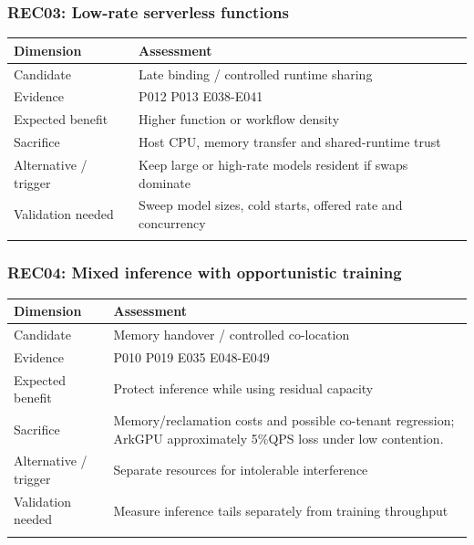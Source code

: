 \subsubsection*{REC03: Low-rate serverless functions}
\begin{longtable}{>{\raggedright\arraybackslash}p{}>{\raggedright\arraybackslash}p{}}
\toprule
\textbf{Dimension} & \textbf{Assessment}\\\midrule\endhead
Candidate & Late binding / controlled runtime sharing\\\addlinespace
Evidence & P012 P013 E038-E041\\\addlinespace
Expected benefit & Higher function or workflow density\\\addlinespace
Sacrifice & Host CPU, memory transfer and shared-runtime trust\\\addlinespace
Alternative / trigger & Keep large or high-rate models resident if swaps dominate\\\addlinespace
Validation needed & Sweep model sizes, cold starts, offered rate and concurrency\\\addlinespace
\bottomrule\end{longtable}
\subsubsection*{REC04: Mixed inference with opportunistic training}
\begin{longtable}{>{\raggedright\arraybackslash}p{}>{\raggedright\arraybackslash}p{}}
\toprule
\textbf{Dimension} & \textbf{Assessment}\\\midrule\endhead
Candidate & Memory handover / controlled co-location\\\addlinespace
Evidence & P010 P019 E035 E048-E049\\\addlinespace
Expected benefit & Protect inference while using residual capacity\\\addlinespace
Sacrifice & Memory/reclamation costs and possible co-tenant regression; ArkGPU approximately 5\%QPS loss under low contention.\\\addlinespace
Alternative / trigger & Separate resources for intolerable interference\\\addlinespace
Validation needed & Measure inference tails separately from training throughput\\\addlinespace
\bottomrule\end{longtable}
